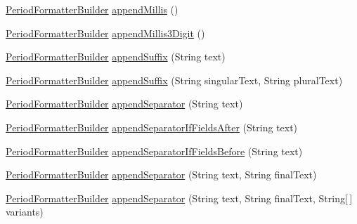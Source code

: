 \begin{DoxyCompactItemize}
\hyperlink{classorg_1_1joda_1_1time_1_1format_1_1_period_formatter_builder}{Period\-Formatter\-Builder} \hyperlink{classorg_1_1joda_1_1time_1_1format_1_1_period_formatter_builder_af82d304000bf39aa3f42baf201d439c4}{append\-Millis} ()
\item 
\hyperlink{classorg_1_1joda_1_1time_1_1format_1_1_period_formatter_builder}{Period\-Formatter\-Builder} \hyperlink{classorg_1_1joda_1_1time_1_1format_1_1_period_formatter_builder_afc57eee220d22585601b55b06a610930}{append\-Millis3\-Digit} ()
\item 
\hyperlink{classorg_1_1joda_1_1time_1_1format_1_1_period_formatter_builder}{Period\-Formatter\-Builder} \hyperlink{classorg_1_1joda_1_1time_1_1format_1_1_period_formatter_builder_a0b5316ad48e555bedc93847bf9db993a}{append\-Suffix} (String text)
\item 
\hyperlink{classorg_1_1joda_1_1time_1_1format_1_1_period_formatter_builder}{Period\-Formatter\-Builder} \hyperlink{classorg_1_1joda_1_1time_1_1format_1_1_period_formatter_builder_a4d4b2b783a7e922b0ac0f9f14403963c}{append\-Suffix} (String singular\-Text, String plural\-Text)
\item 
\hyperlink{classorg_1_1joda_1_1time_1_1format_1_1_period_formatter_builder}{Period\-Formatter\-Builder} \hyperlink{classorg_1_1joda_1_1time_1_1format_1_1_period_formatter_builder_a8d73d568754f12e13fe3c131acccc994}{append\-Separator} (String text)
\item 
\hyperlink{classorg_1_1joda_1_1time_1_1format_1_1_period_formatter_builder}{Period\-Formatter\-Builder} \hyperlink{classorg_1_1joda_1_1time_1_1format_1_1_period_formatter_builder_a74ef42ae0a33c5551e823e099af02bb1}{append\-Separator\-If\-Fields\-After} (String text)
\item 
\hyperlink{classorg_1_1joda_1_1time_1_1format_1_1_period_formatter_builder}{Period\-Formatter\-Builder} \hyperlink{classorg_1_1joda_1_1time_1_1format_1_1_period_formatter_builder_aa5c88ca6a190a174b15ef39d1960fbc4}{append\-Separator\-If\-Fields\-Before} (String text)
\item 
\hyperlink{classorg_1_1joda_1_1time_1_1format_1_1_period_formatter_builder}{Period\-Formatter\-Builder} \hyperlink{classorg_1_1joda_1_1time_1_1format_1_1_period_formatter_builder_a17dd6d637bb327c0845d821f0ea994ee}{append\-Separator} (String text, String final\-Text)
\item 
\hyperlink{classorg_1_1joda_1_1time_1_1format_1_1_period_formatter_builder}{Period\-Formatter\-Builder} \hyperlink{classorg_1_1joda_1_1time_1_1format_1_1_period_formatter_builder_abd0cfbecd0c2c95ea22978bebb04ad43}{append\-Separator} (String text, String final\-Text, String\mbox{[}$\,$\mbox{]} variants)
\end{DoxyCompactItemize}


